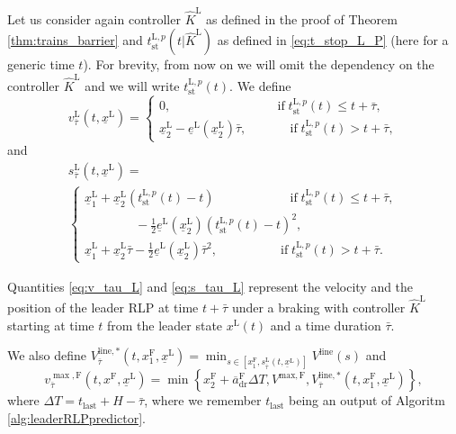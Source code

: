\documentclass[letterpaper, 10 pt, conference]{ieeeconf}
\theoremstyle{definition}
\theoremstyle{nopoint}
\newcounter{Theorem}
\begin{document}
Let us consider again controller $\hat{K}^\mathrm{L}$ as defined in the proof of Theorem \ref{thm:trains_barrier} and $t_{\mathrm{st}}^{\mathrm{L},p}(t |\hat{K}^\mathrm{L})$ as defined in \eqref{eq:t_stop_L_P} (here for a generic time $t$). For brevity, from now on we will omit the dependency on the controller $\hat{K}^\mathrm{L}$ and we will write $t_{\mathrm{st}}^{\mathrm{L},p}(t)$.
We define
\begin{equation}\label{eq:v_tau_L}
 	v_{\bar{\tau}}^\mathrm{L}\left( t,\underline{x}^\mathrm{L} \right)=
 	\begin{cases}
 		0, \qquad \qquad \qquad \quad  \quad \; \, \text{if} \;  t_{\mathrm{st}}^{\mathrm{L},p}(t) \leq t+\bar{\tau}, \\
 		\underline{x}_2^\mathrm{L}-\underline{e}^\mathrm{L}\left(\underline{x}_2^\mathrm{L}\right)\bar{\tau}, \qquad \quad \; \, \text{if} \; t_{\mathrm{st}}^{\mathrm{L},p}(t) > t+\bar{\tau},
 	\end{cases}
\end{equation}
and
 \begin{multline}\label{eq:s_tau_L}
 	s_{\bar{\tau}}^\mathrm{L}\left( t,\underline{x}^\mathrm{L} \right)=\\
 	\begin{cases}
 		\underline{x}_1^\mathrm{L}+ \underline{x}_2^\mathrm{L}\left( t_{\mathrm{st}}^{\mathrm{L},p}(t) -t \right) \qquad \qquad \qquad    \text{if} \; t_{\mathrm{st}}^{\mathrm{L},p}(t) \leq t+\bar{\tau}, \\ \qquad \qquad  -\frac{1}{2}\underline{e}^\mathrm{L}\left(\underline{x}_2^\mathrm{L} \right)\left(t_{\mathrm{st}}^{\mathrm{L},p}(t) -t \right)^2,  \\
 		\underline{x}_1^\mathrm{L}+ \underline{x}_2^\mathrm{L}\bar{\tau} - \frac{1}{2}\underline{e}^\mathrm{L}\left(\underline{x}_2^\mathrm{L} \right)\bar{\tau}^2, \quad \qquad \qquad \text{if}  \; t_{\mathrm{st}}^{\mathrm{L},p}(t) > t+\bar{\tau}.
 	\end{cases}
 \end{multline}

Quantities \eqref{eq:v_tau_L} and \eqref{eq:s_tau_L} represent the velocity and the position of the leader RLP at time $t+\bar{\tau}$ under a braking with controller $\hat{K}^\mathrm{L}$ starting at time $t$  from the leader state $x^\mathrm{L}(t)$ and a time duration $\bar{\tau}$. 


We also define  $V_{\bar{\tau}}^{\mathrm{line},*}(t,x_1^\mathrm{F},\underline{x}^\mathrm{L})=\min_{s\in \left[x_1^\mathrm{F} ,s_{\bar{\tau}}^\mathrm{L}\left(t,\underline{x}^\mathrm{L}\right)\right]} V^{\mathrm{line}}(s)$
and 
\begin{equation}\label{eq:v_tau_F_max}
v_{\bar{\tau}}^{\max, \mathrm{F}}\left( t,x^\mathrm{F},\underline{x}^\mathrm{L} \right)=\min\left\{x_2^\mathrm{F}+\overline{a}_{\mathrm{dr}}^\mathrm{F}\Delta T,V^{\mathrm{max},\mathrm{F}},V_{\bar{\tau}}^{\mathrm{line},*}(t,x_1^\mathrm{F},\underline{x}^\mathrm{L})\right\},
\end{equation}
where $\Delta T =  t_{\mathrm{last}}+H-\bar{\tau}$, where we remember $t_{\mathrm{last}}$ being an output of Algoritm \ref{alg:leaderRLPpredictor}.
\end{document}
